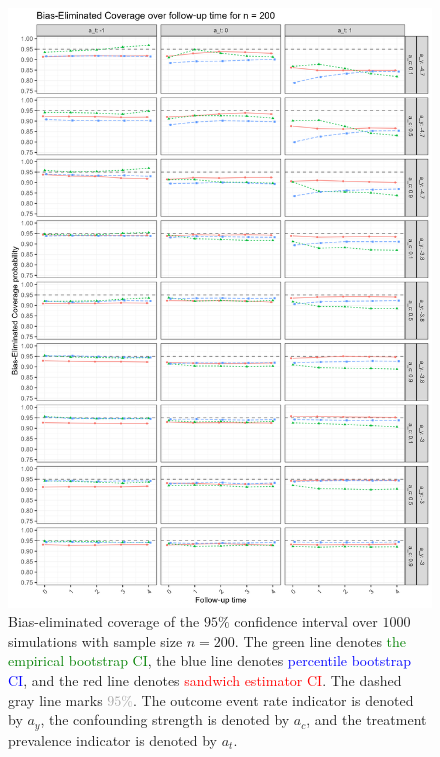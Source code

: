 \documentclass[pdflatex,sn-vancouver-ay]{sn-jnl}%
\theoremstyle{thmstyleone}%
\theoremstyle{thmstyletwo}%
\theoremstyle{thmstylethree}%
\begin{document}
\begin{appendices}
\begin{figure}[H]
\centering
\includegraphics[height=0.95\textheight]{plots/plots_bias_coverage200.png}
\caption{Bias-eliminated coverage of the $95\%$ confidence interval over $1000$ simulations with sample size $n = 200$. The green line denotes \textcolor{green}{the empirical bootstrap CI}, the blue line denotes \textcolor{blue}{percentile bootstrap CI}, and the red line denotes \textcolor{red}{sandwich estimator CI}. The dashed gray line marks \textcolor{darkgray}{$95\%$}. The outcome event rate indicator is denoted by $a_y$, the confounding strength is denoted by $a_c$, and the treatment prevalence indicator is denoted by $a_t$.}\label{plt:biascoverage200}
\end{figure}

\newpage


\end{appendices}
\end{document}

